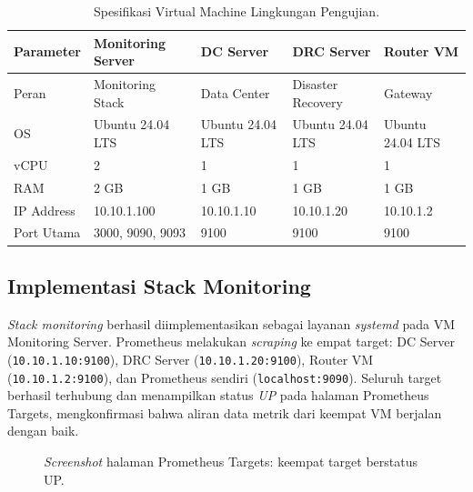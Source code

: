 \documentclass[10pt,twocolumn]{article}
\begin{document}
\begin{table}[!ht]
  \centering
  \caption{Spesifikasi Virtual Machine Lingkungan Pengujian.}
  \label{tab:spesifikasi-vm}
  \begin{tabularx}{\textwidth}{lXXXX}
    \toprule
    \textbf{Parameter} & \textbf{Monitoring Server} & \textbf{DC Server}
                       & \textbf{DRC Server} & \textbf{Router VM} \\
    \midrule
    Peran        & Monitoring Stack   & Data Center       & Disaster Recovery  & Gateway          \\
    OS           & Ubuntu 24.04 LTS   & Ubuntu 24.04 LTS  & Ubuntu 24.04 LTS   & Ubuntu 24.04 LTS \\
    vCPU         & 2                  & 1                 & 1                  & 1                \\
    RAM          & 2 GB               & 1 GB              & 1 GB               & 1 GB             \\
    IP Address   & 10.10.1.100        & 10.10.1.10        & 10.10.1.20         & 10.10.1.2        \\
    Port Utama   & 3000, 9090, 9093   & 9100              & 9100               & 9100             \\
    \bottomrule
  \end{tabularx}
\end{table}

\subsection{Implementasi Stack Monitoring}

\textit{Stack monitoring} berhasil diimplementasikan sebagai layanan \textit{systemd} pada VM
Monitoring Server. Prometheus melakukan \textit{scraping} ke empat target: DC Server
(\texttt{10.10.1.10:9100}), DRC Server (\texttt{10.10.1.20:9100}), Router VM
(\texttt{10.10.1.2:9100}), dan Prometheus sendiri (\texttt{localhost:9090}). Seluruh target berhasil
terhubung dan menampilkan status \textit{UP} pada halaman Prometheus Targets, mengkonfirmasi bahwa
aliran data metrik dari keempat VM berjalan dengan baik.

\begin{figure}[H]
  \centering
  \caption{\textit{Screenshot} halaman Prometheus Targets: keempat target berstatus UP.}
  \label{fig:prometheus-targets}
\end{figure}
\end{document}
